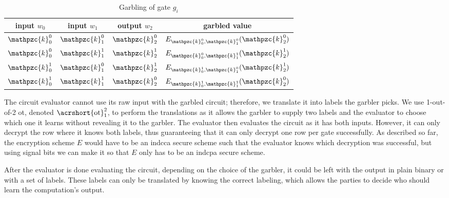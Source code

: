 \begin{center}
    \begin{table}
        \centering
        \begin{threeparttable}
            \begin{tabular}{|c | c | c | c|} 
            \hline
            input $w_0$ & input $w_1$ & output $w_2$ & garbled value \\ [0.5ex] 
            \hline\hline
            $ \mathpzc{k}_0^0 $ & $ \mathpzc{k}_1^0 $ & $ \mathpzc{k}_2^0 $ & $ E_{\mathpzc{k}^0_0, \mathpzc{k}^0_1}(\mathpzc{k}_2^0) $ \\ 
            \hline
            $ \mathpzc{k}_0^0 $ & $ \mathpzc{k}_1^1 $ & $ \mathpzc{k}_2^1 $ & $ E_{\mathpzc{k}^0_0, \mathpzc{k}^1_1}(\mathpzc{k}_2^1) $ \\
            \hline
            $ \mathpzc{k}_0^1 $ & $ \mathpzc{k}_1^0 $ & $ \mathpzc{k}_2^1 $ & $ E_{\mathpzc{k}^1_0, \mathpzc{k}^0_1}(\mathpzc{k}_2^1) $ \\
            \hline
            $ \mathpzc{k}_0^1 $ & $ \mathpzc{k}_1^1 $ & $ \mathpzc{k}_2^0 $ & $ E_{\mathpzc{k}^1_0, \mathpzc{k}^1_1}(\mathpzc{k}_2^0) $ \\ [1ex] 
            \hline
            \end{tabular}
            \caption{Garbling of gate $ g_i $}
            \label{Tab:GarbledGate}
        \end{threeparttable}
    \end{table}
\end{center}

The circuit evaluator cannot use its raw input with the garbled circuit; therefore, we translate it into labels the garbler picks. We use 1-out-of-2 \acrshort{ot}, denoted $ \text{\acrshort{ot}}^2_1$,  to perform the translations as it allows the garbler to supply two labels and the evaluator to choose which one it learns without revealing it to the garbler. The evaluator then evaluates the circuit as it has both inputs. However, it can only decrypt the row where it knows both labels, thus guaranteeing that it can only decrypt one row per gate successfully. As described so far, the encryption scheme $ E $ would have to be an \acrfull{indcca} secure scheme such that the evaluator knows which decryption was successful, but using signal bits \cite{USENIX:MNPS04} we can make it so that $ E $ only has to be an \acrfull{indcpa} secure scheme.

After the evaluator is done evaluating the circuit, depending on the choice of the garbler, it could be left with the output in plain binary or with a set of labels. These labels can only be translated by knowing the correct labeling, which allows the parties to decide who should learn the computation's output.

